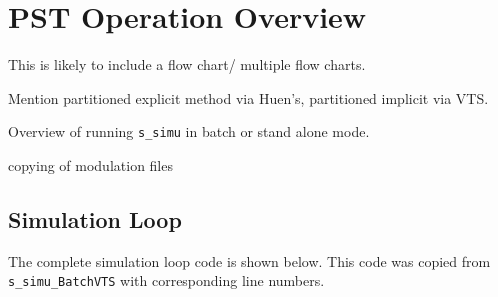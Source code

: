\chapter{PST Operation Overview}

This is likely to include a flow chart/ multiple flow charts.

Mention partitioned explicit method via Huen's, partitioned implicit via VTS.

Overview of running \verb|s_simu| in batch or stand alone mode.

copying of modulation files

\section{Simulation Loop}
The complete simulation loop code is shown below.
This code was copied from \verb|s_simu_BatchVTS| with corresponding line numbers.

